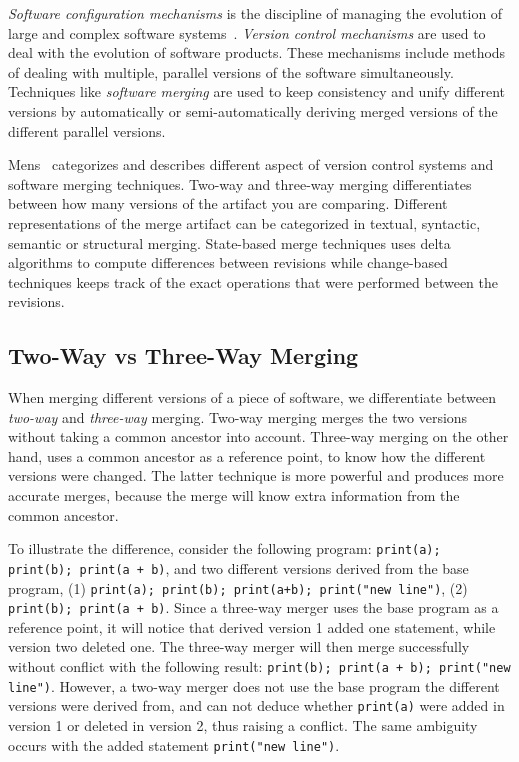 \documentclass[a4paper,english]{ifimaster}
\begin{document}
\textit{Software configuration mechanisms} is the discipline of managing the evolution of large and complex software systems~\cite{cite:software_configuration_management}. \textit{Version control mechanisms} are used to deal with the evolution of software products. These mechanisms include methods of dealing with multiple, parallel versions of the software simultaneously. Techniques like \textit{software merging} are used to keep consistency and unify different versions by automatically or semi-automatically deriving merged versions of the different parallel versions.

Mens~\cite{cite:tom_mens_software_merging_survey} categorizes and describes different aspect of version control systems and software merging techniques. Two-way and three-way merging differentiates between how many versions of the artifact you are comparing. Different representations of the merge artifact can be categorized in textual, syntactic, semantic or structural merging. State-based merge techniques uses delta algorithms to compute differences between revisions while change-based techniques keeps track of the exact operations that were performed between the revisions.

\subsection{Two-Way vs Three-Way Merging}%
\label{sub:two_way_vs_three_way_merging}

When merging different versions of a piece of software, we differentiate between \textit{two-way} and \textit{three-way} merging. Two-way merging merges the two versions without taking a common ancestor into account. Three-way merging on the other hand, uses a common ancestor as a reference point, to know how the different versions were changed. The latter technique is more powerful and produces more accurate merges, because the merge will know extra information from the common ancestor.

To illustrate the difference, consider the following program: \texttt{print(a); print(b); print(a + b)}, and two different versions derived from the base program, (1) \texttt{print(a); print(b); print(a+b); print("new line")}, (2) \texttt{print(b); print(a + b)}. Since a three-way merger uses the base program as a reference point, it will notice that derived version 1 added one statement, while version two deleted one. The three-way merger will then merge successfully without conflict with the following result: \texttt{print(b); print(a + b); print("new line")}. However, a two-way merger does not use the base program the different versions were derived from, and can not deduce whether \texttt{print(a)} were added in version 1 or deleted in version 2, thus raising a conflict. The same ambiguity occurs with the added statement \texttt{print("new line")}.
\end{document}
